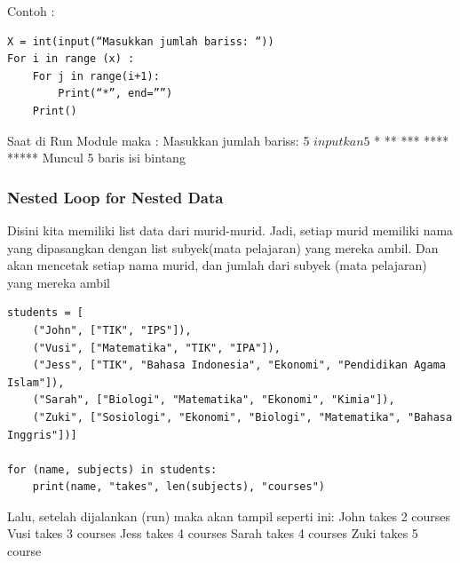 Contoh :
\begin{verbatim}
X = int(input(“Masukkan jumlah bariss: “))
For i in range (x) :
	For j in range(i+1):
		Print(“*”, end=””)
	Print()
\end{verbatim}
Saat di Run Module maka :
Masukkan jumlah bariss: 5 \(inputkan 5\)
*
**
***
****
***** 
Muncul 5 baris isi bintang

\subsubsection{Nested Loop for Nested Data}
Disini kita memiliki list data dari murid-murid. Jadi, setiap murid memiliki nama yang dipasangkan dengan list subyek(mata pelajaran) yang mereka ambil. Dan akan mencetak setiap nama murid, dan jumlah dari subyek (mata pelajaran) yang mereka ambil
\begin{verbatim}
students = [
    ("John", ["TIK", "IPS"]),
    ("Vusi", ["Matematika", "TIK", "IPA"]),
    ("Jess", ["TIK", "Bahasa Indonesia", "Ekonomi", "Pendidikan Agama Islam"]),
    ("Sarah", ["Biologi", "Matematika", "Ekonomi", "Kimia"]),
    ("Zuki", ["Sosiologi", "Ekonomi", "Biologi", "Matematika", "Bahasa Inggris"])]

for (name, subjects) in students:
    print(name, "takes", len(subjects), "courses")
\end{verbatim}
Lalu, setelah dijalankan (run) maka akan tampil seperti ini:
John takes 2 courses
Vusi takes 3 courses
Jess takes 4 courses
Sarah takes 4 courses
Zuki takes 5 course


